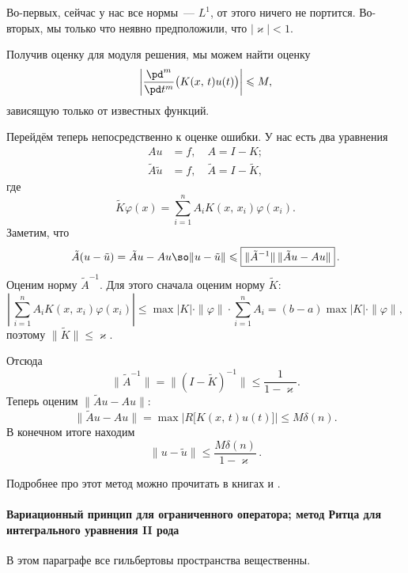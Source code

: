 \documentclass{trlnotes}
\begin{document}
    \begin{rem}
        Во-первых, сейчас у нас все нормы~--- $L^1$, от этого ничего не портится. Во-вторых, мы только что неявно предположили, что $|\varkappa| < 1$.
    \end{rem}

    Получив оценку для модуля решения, мы можем найти оценку
    \[
        \left|\dfrac{\pd^{m}}{\pd t^m} \big(K(x, \, t) u(t)\big)\right| \leqslant M,
    \]
    зависящую только от известных функций.

    Перейдём теперь непосредственно к оценке ошибки. У нас есть два уравнения 
    \begin{align*}
        Au &= f, \quad A = I - K; \\
        \tilde{A} \tilde{u} &= f, \quad \tilde{A} = I - \tilde{K},
    \end{align*}
    где 
    \[
        \tilde{K}\varphi(x) = \sum\limits_{i = 1}^n A_i K(x, \, x_i) \varphi(x_i).
    \]
    Заметим, что
    \[
        \tilde{A}(u - \tilde{u}) = \tilde{A}u - Au \so \|u - \tilde{u}\| \leqslant \boxed{\|\tilde{A}^{-1}\| \, \|\tilde{A}u - Au\|}\,.
    \]
    Оценим норму $\tilde{A}^{-1}$. Для этого сначала оценим норму $\tilde{K}$:
    \[
        \left | \, \sum\limits_{i = 1}^n A_i K(x, \, x_i) \varphi(x_i) \right | \leqslant \max |K| \cdot \|\varphi\| \cdot \sum\limits_{i = 1}^n A_i = (b - a) \max |K| \cdot \|\varphi\|,
    \]
    поэтому $\|\tilde{K}\| \leqslant \varkappa$.

    Отсюда
    \[
        \|\tilde{A}^{-1}\| = \big\|(I - \tilde{K})^{-1}\big\| \leqslant \dfrac{1}{1 - \varkappa}.
    \]
    Теперь оценим $\|\tilde{A}u - Au\|$:
    \[
        \|\tilde{A}u - Au\| = \max \big|R\big[K(x, \, t) u(t)\big]\big| \leqslant M\delta(n).
    \]
    В конечном итоге находим
    \[
        \boxed{\|u - \tilde{u}\| \leqslant \dfrac{M\delta(n)}{1 - \varkappa}}\,.
    \]

    Подробнее про этот метод можно прочитать в книгах \cite{gavurin} и \cite{comp-krilov-2}.

    \paragraph{Вариационный принцип для ограниченного оператора; метод Ритца для интегрального уравнения II рода}

    \begin{rem}
        В этом параграфе все гильбертовы пространства вещественны.
    \end{rem}
\end{document}
